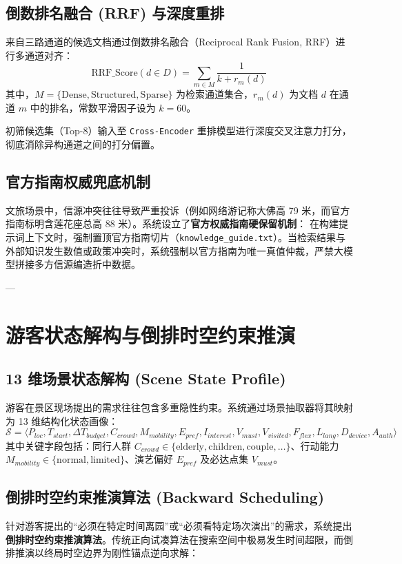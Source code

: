 \documentclass[11pt,a4paper]{ctexart}
\begin{document}
\subsection{倒数排名融合 (RRF) 与深度重排}
来自三路通道的候选文档通过倒数排名融合（Reciprocal Rank Fusion, RRF）进行多通道对齐：
\begin{equation}
    \text{RRF\_Score}(d \in D) = \sum_{m \in M} \frac{1}{k + r_m(d)}
\end{equation}
其中，$M = \{\text{Dense}, \text{Structured}, \text{Sparse}\}$ 为检索通道集合，$r_m(d)$ 为文档 $d$ 在通道 $m$ 中的排名，常数平滑因子设为 $k = 60$。

初筛候选集（Top-8）输入至 \texttt{Cross-Encoder} 重排模型进行深度交叉注意力打分，彻底消除异构通道之间的打分偏置。

\subsection{官方指南权威兜底机制}
文旅场景中，信源冲突往往导致严重投诉（例如网络游记称大佛高 79 米，而官方指南标明含莲花座总高 88 米）。系统设立了\textbf{官方权威指南硬保留机制}：
在构建提示词上下文时，强制置顶官方指南切片（\texttt{knowledge\_guide.txt}）。当检索结果与外部知识发生数值或政策冲突时，系统强制以官方指南为唯一真值仲裁，严禁大模型拼接多方信源编造折中数据。

---

\section{游客状态解构与倒排时空约束推演}

\subsection{13 维场景状态解构 (Scene State Profile)}
游客在景区现场提出的需求往往包含多重隐性约束。系统通过场景抽取器将其映射为 13 维结构化状态画像：
\begin{equation}
    \mathcal{S} = \langle P_{loc}, T_{start}, \Delta T_{budget}, C_{crowd}, M_{mobility}, E_{pref}, I_{interest}, V_{must}, V_{visited}, F_{flex}, L_{lang}, D_{device}, A_{auth} \rangle
\end{equation}
其中关键字段包括：同行人群 $C_{crowd} \in \{\text{elderly}, \text{children}, \text{couple}, \dots\}$、行动能力 $M_{mobility} \in \{\text{normal}, \text{limited}\}$、演艺偏好 $E_{pref}$ 及必达点集 $V_{must}$。

\subsection{倒排时空约束推演算法 (Backward Scheduling)}
针对游客提出的“必须在特定时间离园”或“必须看特定场次演出”的需求，系统提出\textbf{倒排时空约束推演算法}。传统正向试凑算法在搜索空间中极易发生时间超限，而倒排推演以终局时空边界为刚性锚点逆向求解：
\end{document}
